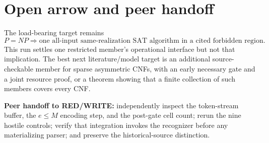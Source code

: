 \documentclass[11pt]{article}
\begin{document}
\section{Open arrow and peer handoff}
The load-bearing target remains
\[
 P=NP\Longrightarrow
 \boxed{\text{one all-input same-realization SAT algorithm in a cited forbidden region}}.
\]
This run settles one restricted member's operational interface but not that
implication.  The best next literature/model target is an additional
source-checkable member for sparse asymmetric CNFs, with an early necessary
gate and a joint resource proof, or a theorem showing that a finite collection
of such members covers every CNF.

\textbf{Peer handoff to RED/WRITE:} independently inspect the token-stream
buffer, the $e\le M$ encoding step, and the post-gate cell count; rerun the
nine hostile controls; verify that integration invokes the recognizer before
any materializing parser; and preserve the historical-source distinction.



\end{document}
